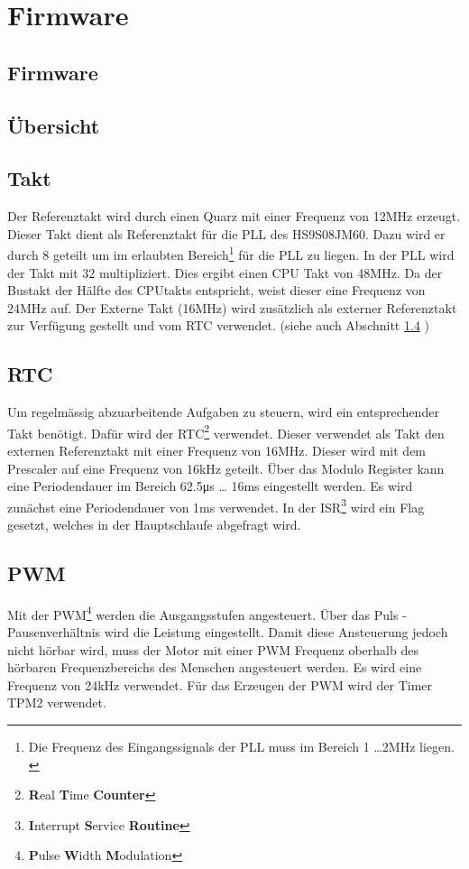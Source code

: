 \ifSTANDALONE
\section{Firmware}
\fi
\ifEMBED
\subsection{Firmware}
\fi

\subsection{Übersicht}

\subsection{Takt}
Der Referenztakt wird durch einen Quarz mit einer Frequenz von 
12\si{\mega\hertz} erzeugt.  Dieser Takt dient als Referenztakt für die PLL 
des HS9S08JM60. Dazu wird er durch 8 geteilt um im erlaubten 
Bereich\footnote{Die Frequenz des Eingangssignals der PLL muss im Bereich 1 
\ldots 2\si{\mega\hertz} liegen. \cite[p.  195]{Datasheet:HCS08}} für die PLL 
zu liegen. In der PLL wird der Takt mit 32 multipliziert. Dies ergibt einen 
CPU Takt von 48\si{\mega\hertz}. Da der Bustakt der Hälfte des CPUtakts 
entspricht, weist dieser eine Frequenz von 24\si{\mega\hertz} auf.  Der 
Externe Takt (16\si{\mega\hertz}) wird zusätzlich als externer Referenztakt 
zur Verfügung gestellt und vom RTC verwendet.  (siehe auch Abschnitt 
\ref{sec:rtc} )

\subsection{RTC}
\label{sec:rtc}
Um regelmässig abzuarbeitende Aufgaben zu steuern, wird ein entsprechender 
Takt benötigt. Dafür wird der RTC\footnote{\textbf{R}eal \textbf{T}ime 
\textbf{Counter}} verwendet. Dieser verwendet als Takt den externen 
Referenztakt mit einer Frequenz von 16\si{\mega\hertz}. Dieser wird mit dem 
Prescaler auf eine Frequenz von 16\si{\kilo\hertz} geteilt. Über das Modulo 
Register kann eine Periodendauer im Bereich 62.5\si{\micro\second} \ldots 
16\si{\milli\second} eingestellt werden. Es wird zunächst eine Periodendauer 
von 1\si{\milli\second} verwendet. In der ISR\footnote{\textbf{I}nterrupt 
\textbf{S}ervice \textbf{Routine}} wird ein Flag gesetzt, welches in der 
Hauptschlaufe abgefragt wird. 

\subsection{PWM}
Mit der PWM\footnote{\textbf{P}ulse \textbf{W}idth \textbf{M}odulation} werden 
die Ausgangsstufen angesteuert. Über das Puls - Pausenverhältnis wird die 
Leistung eingestellt. Damit diese Ansteuerung jedoch nicht hörbar wird, muss 
der Motor mit einer PWM Frequenz oberhalb des hörbaren Frequenzbereichs des 
Menschen angesteuert werden. Es wird eine Frequenz von 24\si{\kilo\hertz} 
verwendet.  Für das Erzeugen der PWM wird der Timer TPM2 verwendet. 

